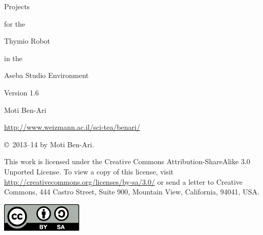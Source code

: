 \thispagestyle{empty}

\begin{center}
\begin{bfseries}
\begin{LARGE}
Projects 

for the 

Thymio Robot

in the 

Aseba Studio Environment

\bigskip
\end{LARGE}

\begin{large}
Version 1.6
\end{large}

\begin{LARGE}
\bigskip\bigskip\bigskip\bigskip

Moti Ben-Ari

\bigskip
\end{LARGE}

\begin{large}
\url{http://www.weizmann.ac.il/sci-tea/benari/}
\end{large}
\end{bfseries}
\end{center}

\vfill

\begin{center}
\copyright{}\  2013--14 by Moti Ben-Ari. 
\end{center}

This work is licensed under the Creative Commons
Attribution-ShareAlike 3.0 Unported License. To view a copy
of this license, visit
\url{http://creativecommons.org/licenses/by-sa/3.0/}
or send a letter to Creative Commons, 444 Castro Street, Suite 900,
Mountain View, California, 94041, USA.

\begin{center}
\includegraphics[width=.2\textwidth]{../images/by-sa}
\end{center}

\tableofcontents
\thispagestyle{empty}
